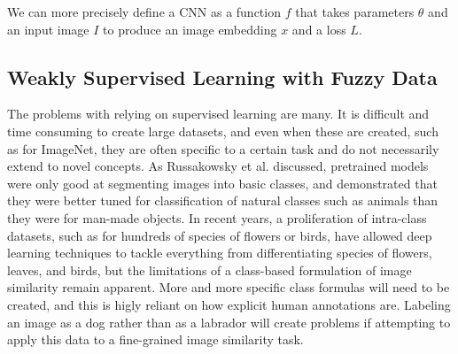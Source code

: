 \documentclass[pageno]{jpaper}
\begin{document}
We can more precisely define a CNN as a function $f$ that takes parameters $\theta$ and an input image $I$ to produce an image embedding $x$ and a loss $L$.


%



\subsection{Weakly Supervised Learning with Fuzzy Data}
The problems with relying on supervised learning are many. It is difficult and time consuming to create large datasets, and even when these are created, such as for ImageNet, they are often specific to a certain task and do not necessarily extend to novel concepts. As Russakowsky et al. discussed\cite{russakovsky2013detecting}, pretrained models were only good at segmenting images into basic classes, and demonstrated that they were better tuned for classification of natural classes such as animals than they were for man-made objects. In recent years, a proliferation of intra-class datasets, such as for hundreds of species of flowers or birds, have allowed deep learning techniques to tackle everything from differentiating species of flowers\cite{angelova2013image}, leaves\cite{rejeb2013vantage}, and birds\cite{berg2014birdsnap}, but the limitations of a class-based formulation of image similarity remain apparent. More and more specific class formulas will need to be created, and this is higly reliant on how explicit human annotations are. Labeling an image as a dog rather than as a labrador will create problems if attempting to apply this data to a fine-grained image similarity task.\\
\end{document}
